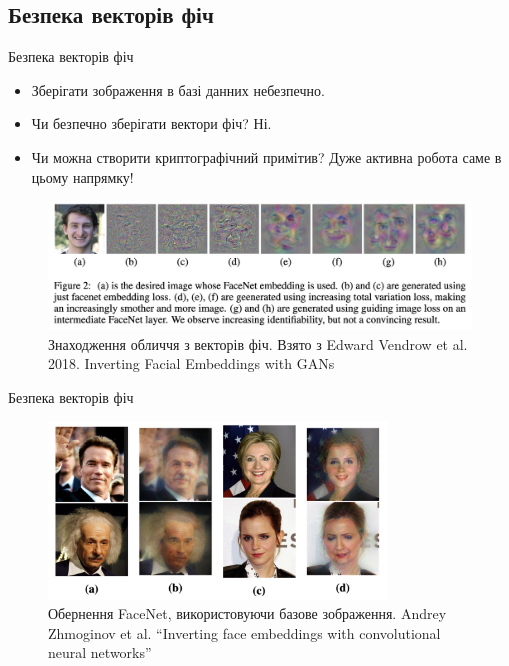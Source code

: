 \documentclass{zkdl-presentation-template}
\begin{document}
    \subsection{Безпека векторів фіч}
    \begin{frame}{Безпека векторів фіч}
        \begin{itemize}
            \item Зберігати зображення в базі данних небезпечно.
            \item Чи безпечно зберігати вектори фіч? Ні.
            \item Чи можна створити криптографічний примітив? Дуже активна робота саме в цьому напрямку!
        \end{itemize}

        \begin{figure}
        \centering
            \includegraphics[width=\textwidth]{images/inverting_facenet.png}
            \caption{Знаходження обличчя з векторів фіч. Взято з Edward Vendrow et al. 2018. Inverting Facial Embeddings with GANs}
        \end{figure}
    \end{frame}

    \begin{frame}{Безпека векторів фіч}
        \begin{figure}
        \centering
            \includegraphics[width=0.8\textwidth]{images/invert_emb.png}
            \caption{Обернення FaceNet, використовуючи базове зображення. Andrey Zhmoginov et al. ``Inverting face embeddings with convolutional neural networks''}
        \end{figure}
    \end{frame}
\end{document}
